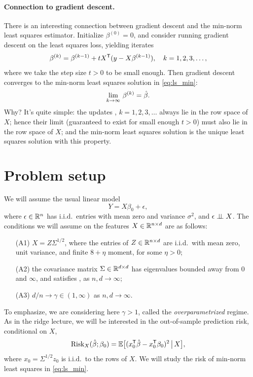 \documentclass{article}
\begin{document}
\paragraph{Connection to gradient descent.}

There is an interesting connection between gradient descent and the min-norm
least squares estimator. Initialize $\beta^{(0)} = 0$, and consider running
gradient descent on the least squares loss, yielding iterates
\[
\beta^{(k)} = \beta^{(k-1)} + t X^{\mathsf{T}} (y-X\beta^{(k-1)}), 
\quad k=1,2,3,\dots,
\]
where we take the step size $t>0$ to be small enough. Then gradient descent
converges to the min-norm least squares solution in \eqref{eq:ls_min}:
\[
\lim_{k \to \infty} \, \beta^{(k)} = \hat{\beta}.
\]
Why? It's quite simple: the updates , $k=1,2,3,\dots$
always lie in the row space of $X$; hence their limit (guaranteed to exist for
small enough $t>0$) must also lie in the row space of $X$; and the min-norm
least squares solution is the unique least squares solution with this property.    

\section{Problem setup}

\def\asto{\overset{\mathrm{as}}{\to}}
\def\dto{\overset{d}{\to}}
\def\Risk{\mathrm{Risk}}
\def\Bias{\mathrm{Bias}}
\def\hSigma{\hat\Sigma}

We will assume the usual linear model 
\begin{equation}
\label{eq:model}
Y = X\beta_0 + \epsilon,
\end{equation}
where $\epsilon \in \mathbb{R}^n$ has i.i.d.\ entries with mean zero and variance
$\sigma^2$, and $\epsilon \perp\!\!\!\perp X$. The conditions we will assume on the
features $X \in \mathbb{R}^{n \times d}$ are as follows:
\begin{itemize}
\item[(A1)] $X = Z \Sigma^{1/2}$, where the entries of $Z \in \mathbb{R}^{n \times d}$
  are i.i.d.\ with mean zero, unit variance, and finite $8+\eta$ moment, for
  some $\eta>0$; 
\item[(A2)] the covariance matrix $\Sigma \in \mathbb{R}^{d \times d}$ has eigenvalues
  bounded away from $0$ and $\infty$, and satisfies \smash{$F_\Sigma \dto H$},
  as $n,d \to \infty$; 
\item[(A3)] $d/n \to \gamma \in (1,\infty)$ as $n,d \to \infty$.
\end{itemize}
To emphasize, we are considering here $\gamma > 1$, called the
\emph{overparametrized} regime. As in the ridge lecture, we will be interested
in the out-of-sample prediction risk, conditional on $X$, 
\begin{equation}
\label{eq:risk}
\Risk_X(\hbeta; \beta_0) = \E \big[ ( x_0^\T \hbeta - x_0^\T \beta_0 )^2
\,\big|\, X \big],
\end{equation}
where $x_0 = \Sigma^{1/2} z_0$ is i.i.d.\ to the rows of $X$. We will study the
risk of min-norm least squares in \eqref{eq:ls_min}. 
\end{document}
